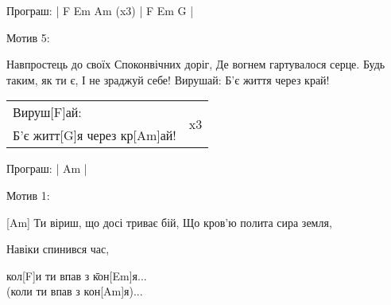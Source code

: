\begin{guitar}
\begin{flushleft}
Програш: | F Em Am (x3) | F Em G |

Мотив 5:

Навпростець до своїх
Споконвічних доріг,
Де вогнем гартувалося серце.
Будь таким, як ти є,
І не зраджуй себе!
Вирушай:
Б'є життя через край!
\begin{tabular}{ @{}l | l }
Вируш[F]ай: & \multirow{2}{*}{ x3 } \\
Б'є житт[G]я через кр[Am]ай!
\end{tabular}

Програш: | Am |

Мотив 1:

[Am] Ти віриш, що досі триває бій,
Що кров'ю полита сира земля,

Навіки спинився час,
\begin{tabbing}
кол[F]и ти впав з \=кон[Em]я... \\
                 \>(коли ти впав з кон[Am]я)...\\
\end{tabbing}
\end{flushleft}
\end{guitar}

